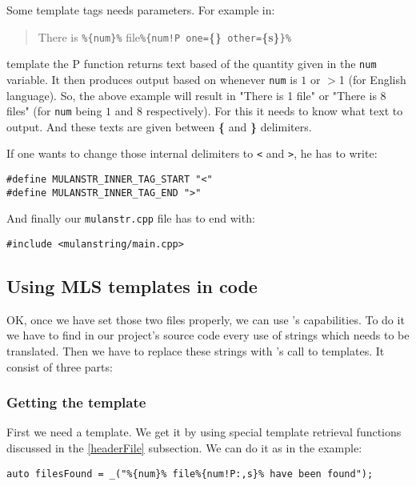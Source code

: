 Some template tags needs parameters. For example in:
\begin{quotation}
	There is \verb+%{num}%+ file\verb+%{num!P one=+\textbf{\{\}}\verb+ other=+\textbf{\{s\}}\verb+}%+
\end{quotation}
template the \textsc{P} function returns text based of the quantity given in the \texttt{num} variable. 
It then produces output based on whenever \texttt{num} is $1$ or $>$1 (for English language).
So, the above example will result in "There is 1 file" or "There is 8 files" (for \texttt{num} being $1$ and $8$ respectively).
For this it needs to know what text to output. And these texts are given between \textbf{\{} and \textbf{\}} delimiters.

If one wants to change those internal delimiters to \verb+<+ and \verb+>+, he has to write:
\begin{verbatim}
#define MULANSTR_INNER_TAG_START "<"
#define MULANSTR_INNER_TAG_END ">"
\end{verbatim}

And finally our \texttt{mulanstr.cpp} file has to end with:
\begin{verbatim}
#include <mulanstring/main.cpp>
\end{verbatim}
\subsection{Using MLS templates in code}
OK, once we have set those two files properly, we can use \mulan{}'s capabilities. 
To do it we have to find in our project's source code every use of strings which needs to be translated. 
Then we have to replace these strings with \mulan{}'s call to templates. It consist of three parts:
\subsubsection{Getting the template}
First we need a template. We get it by using special template retrieval functions discussed in the \ref{headerFile} subsection. 
We can do it as in the example:
\begin{verbatim}
auto filesFound = _("%{num}% file%{num!P:,s}% have been found");
\end{verbatim}

